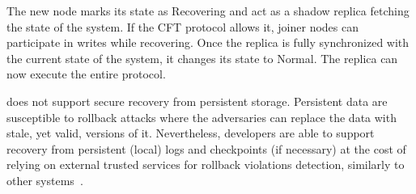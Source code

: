     
     The new node marks its state as Recovering and act as a shadow replica fetching the state of the system. If the CFT protocol allows it, joiner nodes can participate in writes while recovering. Once the replica is fully synchronized with the current state of the system, it changes its state to Normal. The replica can now execute the entire protocol. %

 \projecttitle{} does not support secure recovery from persistent storage. Persistent data are susceptible to rollback attacks where the adversaries can replace the data with stale, yet valid, versions of it. Nevertheless, developers are able to support recovery from persistent (local) logs and checkpoints (if necessary) at the cost of relying on external trusted services for rollback violations detection, similarly to other systems~\cite{engraft, treaty, rote, speicher-fast}.